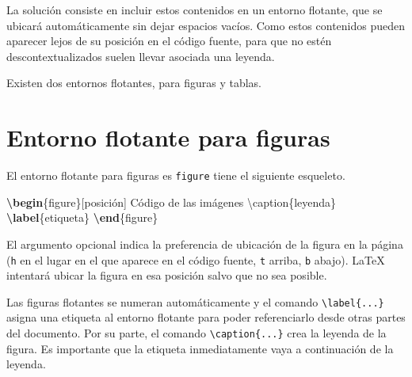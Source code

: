 \documentclass[
  spanish,
  a4paper,
]{scrreport}
\newenvironment{Shaded}{\begin{snugshade}}{\end{snugshade}}
\newcommand{\ExtensionTok}[1]{\textcolor[rgb]{0.00,0.23,0.31}{#1}}
\newcommand{\FunctionTok}[1]{\textcolor[rgb]{0.28,0.35,0.67}{#1}}
\newcommand{\KeywordTok}[1]{\textcolor[rgb]{0.00,0.23,0.31}{\textbf{#1}}}
\newcommand{\NormalTok}[1]{\textcolor[rgb]{0.00,0.23,0.31}{#1}}
\theoremstyle{definition}
\theoremstyle{remark}
\begin{document}
La solución consiste en incluir estos contenidos en un entorno flotante,
que se ubicará automáticamente sin dejar espacios vacíos. Como estos
contenidos pueden aparecer lejos de su posición en el código fuente,
para que no estén descontextualizados suelen llevar asociada una
leyenda.

Existen dos entornos flotantes, para figuras y tablas.

\section{Entorno flotante para
figuras}\label{entorno-flotante-para-figuras}

El entorno flotante para figuras es \texttt{figure} tiene el siguiente
esqueleto.

\begin{Shaded}
\begin{Highlighting}[]
\KeywordTok{\textbackslash{}begin}\NormalTok{\{}\ExtensionTok{figure}\NormalTok{\}[posición]}
\NormalTok{    Código de las imágenes}
\FunctionTok{\textbackslash{}caption}\NormalTok{\{leyenda\}}
\KeywordTok{\textbackslash{}label}\NormalTok{\{}\ExtensionTok{etiqueta}\NormalTok{\}}
\KeywordTok{\textbackslash{}end}\NormalTok{\{}\ExtensionTok{figure}\NormalTok{\}}
\end{Highlighting}
\end{Shaded}

El argumento opcional indica la preferencia de ubicación de la figura en
la página (\texttt{h} en el lugar en el que aparece en el código fuente,
\texttt{t} arriba, \texttt{b} abajo). LaTeX intentará ubicar la figura
en esa posición salvo que no sea posible.

Las figuras flotantes se numeran automáticamente y el comando
\texttt{\textbackslash{}label\{...\}} asigna una etiqueta al entorno
flotante para poder referenciarlo desde otras partes del documento. Por
su parte, el comando \texttt{\textbackslash{}caption\{...\}} crea la
leyenda de la figura. Es importante que la etiqueta inmediatamente vaya
a continuación de la leyenda.
\end{document}
